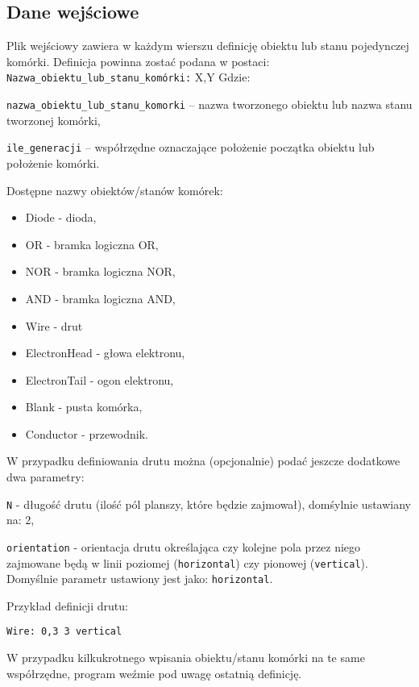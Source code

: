 \documentclass[a4paper,11pt, notitlepage ]{article}
\begin{document}
\subsection{Dane wejściowe}
Plik wejściowy zawiera w każdym wierszu definicję obiektu lub stanu pojedynczej komórki. Definicja powinna zostać podana w postaci:
 \newline \verb+Nazwa_obiektu_lub_stanu_komórki:+ X,Y
\newline Gdzie: 
\begin{description}
\item \verb+nazwa_obiektu_lub_stanu_komorki+ – nazwa tworzonego obiektu lub nazwa stanu tworzonej komórki,
\item \verb+ile_generacji+ – współrzędne oznaczające położenie początka obiektu lub położenie komórki.
\end{description}
Dostępne nazwy obiektów/stanów komórek:
\begin{itemize}
\item Diode - dioda,
\item OR - bramka logiczna OR,
\item NOR - bramka logiczna NOR,
\item AND - bramka logiczna AND,
\item Wire - drut
\item ElectronHead - głowa elektronu,
\item ElectronTail - ogon elektronu,
\item Blank - pusta komórka,
\item Conductor - przewodnik.

\end{itemize}
W przypadku definiowania drutu można (opcjonalnie) podać jeszcze dodatkowe dwa parametry:
\begin{description}
\item \verb+N+ - długość drutu (ilość pól planszy, które będzie zajmował), domśylnie ustawiany na: 2,
\item \verb+orientation+ - orientacja drutu określająca czy kolejne pola przez niego zajmowane będą w linii poziomej (\verb+horizontal+) czy pionowej (\verb+vertical+). Domyślnie parametr ustawiony jest jako: \verb+horizontal+.
\end{description}
Przykład definicji drutu: 
\begin{verbatim}Wire: 0,3 3 vertical \end{verbatim}
W przypadku kilkukrotnego wpisania obiektu/stanu komórki na te same współrzędne, program weźmie pod uwagę ostatnią definicję.
\end{document}
